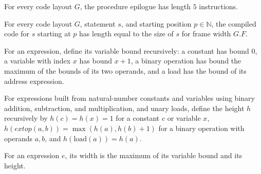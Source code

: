 \begin{theorem}
\label{Light.Compiler.length_epilogue}
\leanok
{}
For every code layout $G$, the procedure epilogue has length $5$ instructions.
\end{theorem}

\begin{theorem}
\label{Light.Compiler.length_compileStmt}
\leanok
{}
For every code layout $G$, statement $s$, and starting position $p\in\mathbb N$, the
compiled code for $s$ starting at $p$ has length equal to the size of $s$ for frame
width $G.F$.
\end{theorem}

\begin{definition}
\label{Light.Expr.vars}
\leanok
{}
For an expression, define its variable bound recursively: a constant has bound $0$, a
variable with index $x$ has bound $x+1$, a binary operation has bound the maximum of the
bounds of its two operands, and a load has the bound of its address expression.
\end{definition}

\begin{definition}
\label{Light.Expr.height}
\leanok
{}
For expressions built from natural-number constants and variables using binary addition,
subtraction, and multiplication, and unary loads, define the height $h$ recursively by
$h(c)=h(x)=1$ for a constant $c$ or variable $x$, $h(	ext{op}(a,b))=\max(h(a),h(b)+1)$
for a binary operation with operands $a,b$, and $h(\text{load}(a))=h(a)$.
\end{definition}

\begin{definition}
\label{Light.Expr.width}
\leanok
{}
For an expression $e$, its width is the maximum of its variable bound and its height.
\end{definition}


